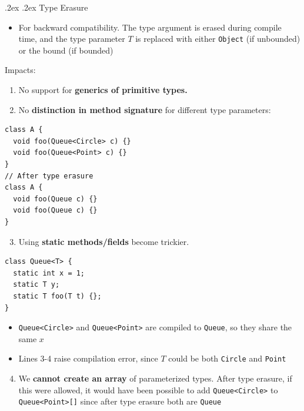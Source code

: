\documentclass[10pt,landscape,a4paper]{article}
\makeatletter
\renewcommand{\subsubsection}{\@startsection{subsubsection}{1}{0mm}%
                                {.2ex}%
                                {.2ex}%
                                {\rmfamily\bfseries}}
\makeatother
\begin{document}
\begin{multicols*}{3}
  \subsubsection{Type Erasure}
  \begin{itemize}
    \item For backward compatibility. The type argument is erased during compile time, and the type parameter $T$ is replaced with either \texttt{Object} (if unbounded) or the bound (if bounded)
  \end{itemize}
  Impacts:
  \begin{enumerate}
    \item No support for \textbf{generics of primitive types.}
    \item No \textbf{distinction in method signature} for different type parameters:
  \end{enumerate}
  \begin{verbatim}
class A {
  void foo(Queue<Circle> c) {}
  void foo(Queue<Point> c) {}
}
// After type erasure
class A {
  void foo(Queue c) {}
  void foo(Queue c) {}
}
        \end{verbatim}
  \begin{enumerate}
    \setcounter{enumi}{2}
    \item Using \textbf{static methods/fields} become trickier.
  \end{enumerate}
  \begin{verbatim}
class Queue<T> {
  static int x = 1;
  static T y;
  static T foo(T t) {};
}
        \end{verbatim}
  \begin{itemize}
    \item \texttt{Queue<Circle>} and \texttt{Queue<Point>} are compiled to \texttt{Queue}, so they share the same $x$
    \item Lines 3-4 raise compilation error, since $T$ could be both \texttt{Circle} and \texttt{Point}
  \end{itemize}
  \begin{enumerate}
    \setcounter{enumi}{3}
    \item We \textbf{cannot create an array} of parameterized types. After type erasure, if this were allowed, it would have been possible to add \texttt{Queue<Circle>} to \texttt{Queue<Point>[]} since after type erasure both are \texttt{Queue}
  \end{enumerate}

\end{multicols*}
\end{document}
